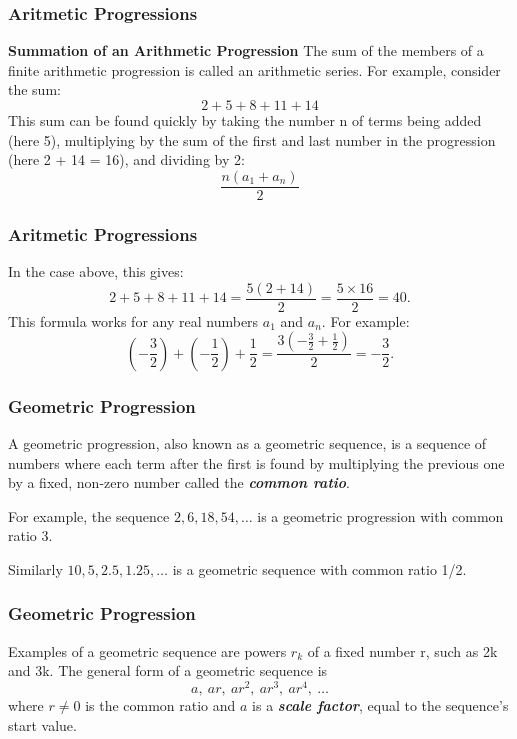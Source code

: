 \documentclass{beamer}
\begin{document}
\begin{frame}
	\frametitle{Aritmetic Progressions}
\textbf{Summation of an Arithmetic Progression}
The sum of the members of a finite arithmetic progression is called an arithmetic series. For example, consider the sum:
\[2+5+8+11+14\]
This sum can be found quickly by taking the number n of terms being added (here 5), multiplying by the sum of the first and last number in the progression (here 2 + 14 = 16), and dividing by 2:
\[{\frac  {n(a_{1}+a_{n})}{2}}\]
\end{frame}

\begin{frame}
	\frametitle{Aritmetic Progressions}
In the case above, this gives:
\[2+5+8+11+14={\frac  {5(2+14)}{2}}={\frac  {5\times 16}{2}}=40.\]
This formula works for any real numbers $a_{1}$ and $a_{n}$. For example:
\[\left(-{\frac  {3}{2}}\right)+\left(-{\frac  {1}{2}}\right)+{\frac  {1}{2}}={\frac  {3\left(-{\frac  {3}{2}}+{\frac  {1}{2}}\right)}{2}}=-{\frac  {3}{2}}.\]
\end{frame}

\begin{frame}
	\frametitle{Geometric Progression}
A geometric progression, also known as a geometric sequence, is a sequence of numbers where each term after the first is found by multiplying the previous one by a fixed, non-zero number called the \textit{\textbf{common ratio}}. 

\noindent For example, the sequence $2, 6, 18, 54, \ldots$ is a geometric progression with common ratio 3. 

\noindent Similarly $10, 5, 2.5, 1.25, \ldots$ is a geometric sequence with common ratio 1/2.

\end{frame}

\begin{frame}
	\frametitle{Geometric Progression}

\noindent Examples of a geometric sequence are powers $r_k$ of a fixed number r, such as 2k and 3k. The general form of a geometric sequence is
\[a,\ ar,\ ar^{2},\ ar^{3},\ ar^{4},\ \ldots \]
where $r \neq 0$ is the common ratio and $a$ is a \textit{\textbf{scale factor}}, equal to the sequence's start value.
\end{frame}
\end{document}
